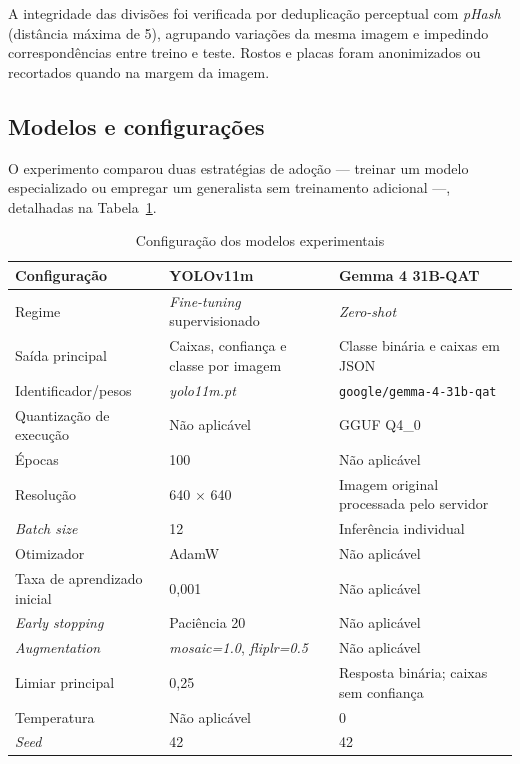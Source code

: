 \documentclass[kdmile,a4paper]{kdmile}
\begin{document}
A integridade das divisões foi verificada por deduplicação perceptual com \emph{pHash} (distância máxima de 5), agrupando variações da mesma imagem e impedindo correspondências entre treino e teste. Rostos e placas foram anonimizados ou recortados quando na margem da imagem.

\subsection{Modelos e configurações}
\label{sec:modelos-configuracoes}

O experimento comparou duas estratégias de adoção --- treinar um modelo especializado ou empregar um generalista sem treinamento adicional ---, detalhadas na Tabela~\ref{tab:configuracao}.

\begin{table}[t]
\centering
\footnotesize
\caption{Configuração dos modelos experimentais}
\label{tab:configuracao}
\begin{tabular}{lp{4.2cm}p{5.2cm}}
\toprule
\textbf{Configuração} & \textbf{YOLOv11m} & \textbf{Gemma 4 31B-QAT} \\
\midrule
Regime & \emph{Fine-tuning} supervisionado & \emph{Zero-shot} \\
Saída principal & Caixas, confiança e classe por imagem & Classe binária e caixas em JSON \\
Identificador/pesos & \emph{yolo11m.pt} & \texttt{google/gemma-4-31b-qat} \\
Quantização de execução & Não aplicável & GGUF Q4\_0 \\
Épocas & 100 & Não aplicável \\
Resolução & 640 $\times$ 640 & Imagem original processada pelo servidor \\
\emph{Batch size} & 12 & Inferência individual \\
Otimizador & AdamW & Não aplicável \\
Taxa de aprendizado inicial & 0,001 & Não aplicável \\
\emph{Early stopping} & Paciência 20 & Não aplicável \\
\emph{Augmentation} & \emph{mosaic=1.0}, \emph{fliplr=0.5} & Não aplicável \\
Limiar principal & 0,25 & Resposta binária; caixas sem confiança \\
Temperatura & Não aplicável & 0 \\
\emph{Seed} & 42 & 42 \\
\bottomrule
\end{tabular}
\end{table}
\end{document}
